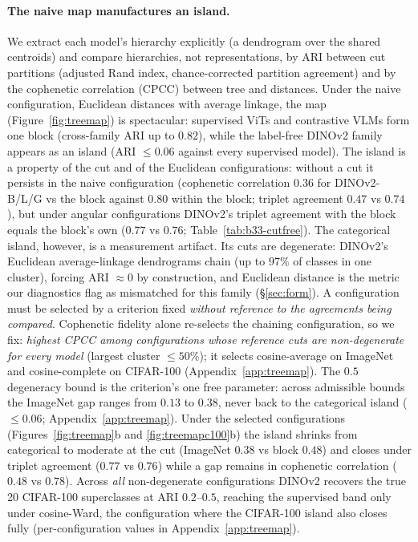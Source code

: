 \paragraph{The naive map manufactures an island.} We extract each model's hierarchy explicitly (a dendrogram over the shared centroids) and compare hierarchies, not representations, by ARI between cut partitions (adjusted Rand index, chance-corrected partition agreement) and by the cophenetic correlation (CPCC) between tree and distances. Under the naive configuration, Euclidean distances with average linkage, the map (Figure~\ref{fig:treemap}) is spectacular: supervised ViTs and contrastive VLMs form one block (cross-family ARI up to $0.82$), while the label-free DINOv2 family appears as an island (ARI $\le 0.06$ against every supervised model). The island is a property of the cut and of the Euclidean configurations: without a cut it persists in the naive configuration (cophenetic correlation $0.36$ for DINOv2-B/L/G vs the block against $0.80$ within the block; triplet agreement $0.47$ vs $0.74$), but under angular configurations DINOv2's triplet agreement with the block equals the block's own ($0.77$ vs $0.76$; Table~\ref{tab:b33-cutfree}). %
The categorical island, however, is a measurement artifact. Its cuts are degenerate: DINOv2's Euclidean average-linkage dendrograms chain (up to $97\%$ of classes in one cluster), forcing ARI $\approx 0$ by construction, and Euclidean distance is the metric our diagnostics flag as mismatched for this family (\S\ref{sec:form}). %
A configuration must be selected by a criterion fixed \emph{without reference to the agreements being compared}. Cophenetic fidelity alone re-selects the chaining configuration, so we fix: \emph{highest CPCC among configurations whose reference cuts are non-degenerate for every model} (largest cluster $\le 50\%$); it selects cosine-average on ImageNet and cosine-complete on CIFAR-100 (Appendix~\ref{app:treemap}). The $0.5$ degeneracy bound is the criterion's one free parameter: across admissible bounds the ImageNet gap ranges from $0.13$ to $0.38$, never back to the categorical island ($\le0.06$; Appendix~\ref{app:treemap}). %
Under the selected configurations (Figures~\ref{fig:treemap}b and \ref{fig:treemapc100}b) the island shrinks from categorical to moderate at the cut (ImageNet $0.38$ vs block $0.48$) and closes under triplet agreement ($0.77$ vs $0.76$) while a gap remains in cophenetic correlation ($0.48$ vs $0.78$). Across \emph{all} non-degenerate configurations DINOv2 recovers the true 20 CIFAR-100 superclasses at ARI $0.2$--$0.5$, reaching the supervised band only under cosine-Ward, the configuration where the CIFAR-100 island also closes fully (per-configuration values in Appendix~\ref{app:treemap}). %

